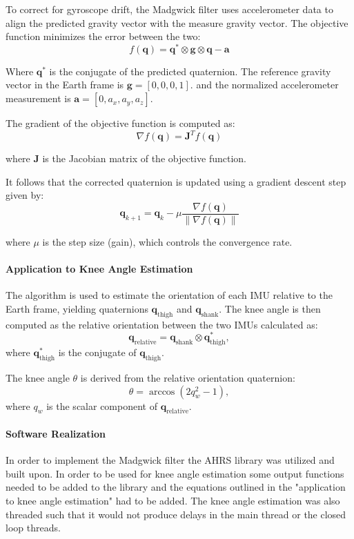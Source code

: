 To correct for gyroscope drift, the Madgwick filter uses accelerometer data to align the predicted gravity vector with the measure gravity vector. The objective function minimizes the error between the two:
\[
f(\mathbf{q}) = \mathbf{q}^* \otimes \mathbf{g} \otimes \mathbf{q} - \mathbf{a}
\]

Where  \( \mathbf{q}^* \) is the conjugate of the predicted quaternion. The reference gravity vector in the Earth frame is \(\mathbf{g} = [0, 0, 0, 1].\) and the normalized accelerometer measurement is
    \(
    \mathbf{a} = [0, a_x, a_y, a_z].
    \)

The gradient of the objective function is computed as:
\[
\nabla f(\mathbf{q}) = \mathbf{J}^T f(\mathbf{q})
\]

where \( \mathbf{J} \) is the Jacobian matrix of the objective function.

It follows that the corrected quaternion is updated using a gradient descent step given by:
\[
\mathbf{q}_{k+1} = \mathbf{q}_k - \mu \frac{\nabla f(\mathbf{q})}{\|\nabla f(\mathbf{q})\|}
\]

where \( \mu \) is the step size (gain), which controls the convergence rate.
\newline

\paragraph*{Application to Knee Angle Estimation}

 The algorithm is used to estimate the orientation of each IMU relative to the Earth frame, yielding quaternions \( \mathbf{q}_{\text{thigh}} \) and \( \mathbf{q}_{\text{shank}} \). The knee angle is then computed as the relative orientation between the two IMUs calculated as:
\[
\mathbf{q}_{\text{relative}} = \mathbf{q}_{\text{shank}} \otimes \mathbf{q}_{\text{thigh}}^*,
\]
where \( \mathbf{q}_{\text{thigh}}^* \) is the conjugate of \( \mathbf{q}_{\text{thigh}} \).

The knee angle \( \theta \) is derived from the relative orientation quaternion:
\[
\theta = \arccos{\left( 2q_w^2 - 1 \right)},
\]
where \( q_w \) is the scalar component of \( \mathbf{q}_{\text{relative}} \).

\paragraph*{Software Realization}
In order to implement the Madgwick filter the AHRS library was utilized \cite{noauthor_madgwick_nodate} and built upon. In order to be used for knee angle estimation some output functions needed to be added to the library and the equations outlined in the "application to knee angle estimation" had to be added. The knee angle estimation was also threaded such that it would not produce delays in the main thread or the closed loop threads. 

